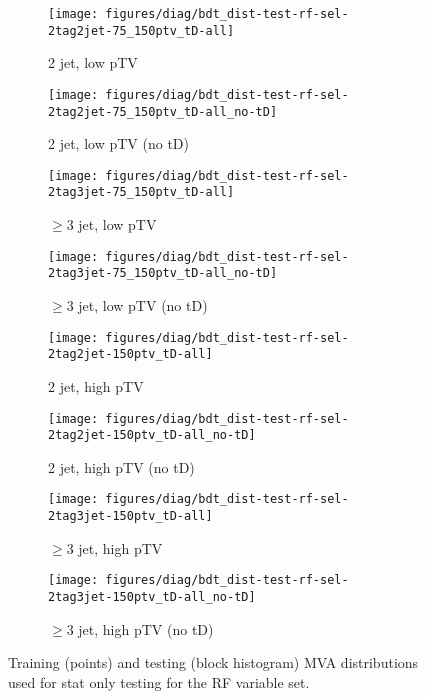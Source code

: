 \begin{figure}[!htbp]\captionsetup{justification=centering}
  \centering
  \begin{subfigure}[t]{0.49\textwidth}\centering\texttt{[image: figures/diag/bdt\_dist-test-rf-sel-2tag2jet-75\_150ptv\_tD-all]}\caption{2 jet, low pTV}\end{subfigure}
  \begin{subfigure}[t]{0.49\textwidth}\centering\texttt{[image: figures/diag/bdt\_dist-test-rf-sel-2tag2jet-75\_150ptv\_tD-all\_no-tD]}\caption{2 jet, low pTV (no tD)}\end{subfigure}
  \begin{subfigure}[t]{0.49\textwidth}\centering\texttt{[image: figures/diag/bdt\_dist-test-rf-sel-2tag3jet-75\_150ptv\_tD-all]}\caption{$\ge3$ jet, low pTV}\end{subfigure}
  \begin{subfigure}[t]{0.49\textwidth}\centering\texttt{[image: figures/diag/bdt\_dist-test-rf-sel-2tag3jet-75\_150ptv\_tD-all\_no-tD]}\caption{$\ge3$ jet, low pTV (no tD)}\end{subfigure}
  \begin{subfigure}[t]{0.49\textwidth}\centering\texttt{[image: figures/diag/bdt\_dist-test-rf-sel-2tag2jet-150ptv\_tD-all]}\caption{2 jet, high pTV}\end{subfigure}
  \begin{subfigure}[t]{0.49\textwidth}\centering\texttt{[image: figures/diag/bdt\_dist-test-rf-sel-2tag2jet-150ptv\_tD-all\_no-tD]}\caption{2 jet, high pTV (no tD)}\end{subfigure}
  \begin{subfigure}[t]{0.49\textwidth}\centering\texttt{[image: figures/diag/bdt\_dist-test-rf-sel-2tag3jet-150ptv\_tD-all]}\caption{$\ge3$ jet, high pTV}\end{subfigure}
  \begin{subfigure}[t]{0.49\textwidth}\centering\texttt{[image: figures/diag/bdt\_dist-test-rf-sel-2tag3jet-150ptv\_tD-all\_no-tD]}\caption{$\ge3$ jet, high pTV (no tD)}\end{subfigure}
  \caption{Training (points) and testing (block histogram) MVA distributions used for stat only testing for the RF variable set.}
  \label{fig:rf-sel-testing}
\end{figure}

